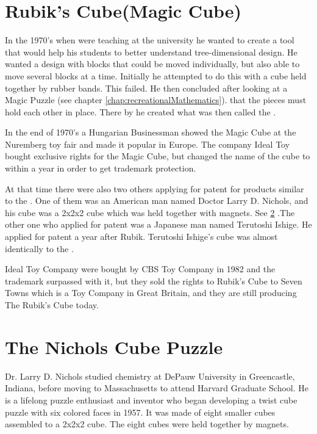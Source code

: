 \section{Rubik's Cube(Magic Cube)}


In the 1970's when \erno{} were teaching at the university he wanted to create a tool that would help his students to better understand tree-dimensional design. He wanted a design with blocks that could be moved individually, but also able to move several blocks at a time. Initially he attempted to do this with a cube held together by rubber bands. This failed. He then concluded after looking at a  Magic Puzzle (see chapter \ref{chap:recreationalMathematics}).
 that the pieces must hold each other in place. There by he created what was then called the \mcube{}. 


In the end of 1970's a Hungarian Businessman showed the Magic Cube at the Nuremberg toy fair and made it popular in Europe. The company Ideal Toy bought exclusive rights for the Magic Cube, but changed the name of the cube to \rubik{} within a year in order to get trademark protection.

At that time there were also two others applying for patent for products similar to the \rubik{}.  One of them was an American man named Doctor Larry D. Nichols, and his cube was a 2x2x2 cube which was held together with magnets. See \ref{sec:nichols} .The other one who applied for patent was a Japanese man named Terutoshi Ishige. He applied for patent a year after Rubik. Terutoshi Ishige's cube was almost identically to the \rubik{}.

Ideal Toy Company were bought by CBS Toy Company in 1982 and the trademark surpassed with it, but they sold the rights to Rubik's Cube to Seven Towns which is a Toy Company in Great Britain, and they are still producing The Rubik's Cube today.

\section{The Nichols Cube Puzzle}
\label{sec:nichols}
Dr. Larry D. Nichols studied chemistry at DePauw University in Greencastle, Indiana, before moving to Massachusetts to attend Harvard Graduate School. 
He is a lifelong puzzle enthusiast and inventor who  began developing a twist cube puzzle with six colored faces in 1957. It was made of eight smaller cubes assembled to a 2x2x2 cube. The eight cubes were held together by magnets.


